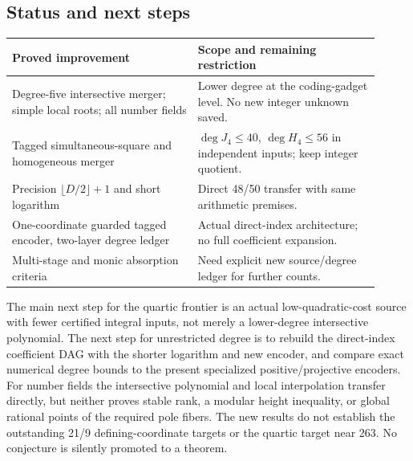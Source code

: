 \documentclass[11pt]{article}
\begin{document}
\subsection{Status and next steps}
\begin{center}\small
\begin{tabular}{p{0.46\linewidth}p{0.45\linewidth}}\toprule
Proved improvement & Scope and remaining restriction\\\midrule
Degree-five intersective merger; simple local roots; all number fields
 & Lower degree at the coding-gadget level. No new integer unknown saved.\\
Tagged simultaneous-square and homogeneous merger
 & $\deg J_4\le40$, $\deg H_4\le56$ in independent inputs; keep integer quotient.\\
Precision $\lfloor D/2\rfloor+1$ and short logarithm
 & Direct 48/50 transfer with same arithmetic premises.\\
One-coordinate guarded tagged encoder, two-layer degree ledger
 & Actual direct-index architecture; no full coefficient expansion.\\
Multi-stage and monic absorption criteria
 & Need explicit new source/degree ledger for further counts.\\\bottomrule
\end{tabular}
\end{center}
The main next step for the quartic frontier is an actual low-quadratic-cost
source with fewer certified integral inputs, not merely a lower-degree
intersective polynomial. The next step for unrestricted degree is to
rebuild the direct-index coefficient DAG with the shorter logarithm and
new encoder, and compare exact numerical degree bounds to the present
specialized positive/projective encoders. For number fields the
intersective polynomial and local interpolation transfer directly, but
neither proves stable rank, a modular height inequality, or global
rational points of the required pole fibers. The new results do not
establish the outstanding 21/9 defining-coordinate targets or the
quartic target near 263. No conjecture is silently promoted to a theorem.
\end{document}

